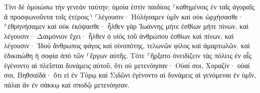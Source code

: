 \documentclass{openreader}
\begin{document}
Τίνι δὲ ὁμοιώσω τὴν γενεὰν ταύτην; ὁμοία ἐστὶν παιδίοις ⸂καθημένοις ἐν ταῖς ἀγοραῖς ἃ προσφωνοῦντα τοῖς ἑτέροις⸃ 
⸀λέγουσιν· Ηὐλήσαμεν ὑμῖν καὶ οὐκ ὠρχήσασθε· ⸀ἐθρηνήσαμεν καὶ οὐκ ἐκόψασθε· 
ἦλθεν γὰρ Ἰωάννης μήτε ἐσθίων μήτε πίνων, καὶ λέγουσιν· Δαιμόνιον ἔχει· 
ἦλθεν ὁ υἱὸς τοῦ ἀνθρώπου ἐσθίων καὶ πίνων, καὶ λέγουσιν· Ἰδοὺ ἄνθρωπος φάγος καὶ οἰνοπότης, τελωνῶν φίλος καὶ ἁμαρτωλῶν. καὶ ἐδικαιώθη ἡ σοφία ἀπὸ τῶν ⸀ἔργων αὐτῆς. 
Τότε ⸀ἤρξατο ὀνειδίζειν τὰς πόλεις ἐν αἷς ἐγένοντο αἱ πλεῖσται δυνάμεις αὐτοῦ, ὅτι οὐ μετενόησαν· 
Οὐαί σοι, Χοραζίν· οὐαί σοι, Βηθσαϊδά· ὅτι εἰ ἐν Τύρῳ καὶ Σιδῶνι ἐγένοντο αἱ δυνάμεις αἱ γενόμεναι ἐν ὑμῖν, πάλαι ἂν ἐν σάκκῳ καὶ σποδῷ μετενόησαν. 
\end{document}

